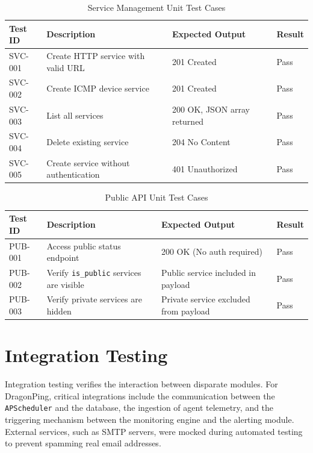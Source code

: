 \documentclass[12pt,a4paper,oneside]{report}
\begin{document}
\begin{table}[H]
\centering
\begin{tabularx}{\textwidth}{|l|X|X|l|}
\hline
\textbf{Test ID} & \textbf{Description} & \textbf{Expected Output} & \textbf{Result} \\
\hline
SVC-001 & Create HTTP service with valid URL & 201 Created & Pass \\
\hline
SVC-002 & Create ICMP device service & 201 Created & Pass \\
\hline
SVC-003 & List all services & 200 OK, JSON array returned & Pass \\
\hline
SVC-004 & Delete existing service & 204 No Content & Pass \\
\hline
SVC-005 & Create service without authentication & 401 Unauthorized & Pass \\
\hline
\end{tabularx}
\caption{Service Management Unit Test Cases}
\label{tab:test_services}
\end{table}

\begin{table}[H]
\centering
\begin{tabularx}{\textwidth}{|l|X|X|l|}
\hline
\textbf{Test ID} & \textbf{Description} & \textbf{Expected Output} & \textbf{Result} \\
\hline
PUB-001 & Access public status endpoint & 200 OK (No auth required) & Pass \\
\hline
PUB-002 & Verify \texttt{is\_public} services are visible & Public service included in payload & Pass \\
\hline
PUB-003 & Verify private services are hidden & Private service excluded from payload & Pass \\
\hline
\end{tabularx}
\caption{Public API Unit Test Cases}
\label{tab:test_public}
\end{table}

\section{Integration Testing}
\noindent Integration testing verifies the interaction between disparate modules. For DragonPing, critical integrations include the communication between the \texttt{APScheduler} and the database, the ingestion of agent telemetry, and the triggering mechanism between the monitoring engine and the alerting module. External services, such as SMTP servers, were mocked during automated testing to prevent spamming real email addresses.
\end{document}
